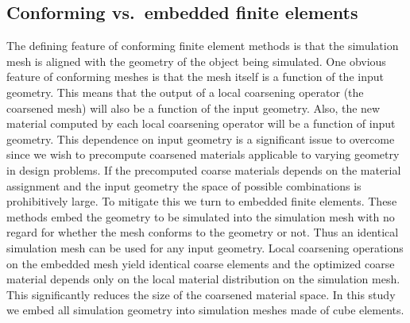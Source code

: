 \subsection{Conforming vs.~embedded finite elements}
The defining feature of conforming finite element methods is that the simulation mesh is aligned with the geometry of the object being simulated. One obvious feature of conforming meshes is that the mesh itself is a function of the input geometry. This means that the output of a local coarsening operator (the coarsened mesh) will also be a function of the input geometry. Also, the new material computed by each local coarsening operator will be a function of input geometry. This dependence on input geometry is a significant issue to overcome since we wish to precompute coarsened materials applicable to varying geometry in design problems. If the precomputed coarse materials depends on the material assignment and the input geometry the space of possible combinations is prohibitively large.
To mitigate this we turn to embedded finite elements. These methods embed the geometry to be simulated into the simulation mesh with no regard for whether the mesh conforms to the geometry or not. Thus an identical simulation mesh can be used for any input geometry. Local coarsening operations on the embedded mesh yield identical coarse elements and the optimized coarse material depends only on the local material distribution on the simulation mesh.  This significantly reduces the size of the coarsened material space. In this study we embed all simulation geometry into simulation meshes made of cube elements.

